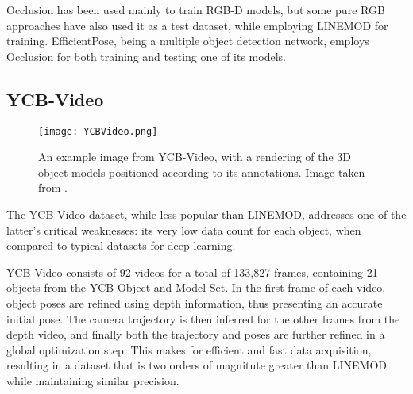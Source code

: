 Occlusion has been used mainly to train RGB-D models, but some pure RGB approaches \cite{PVNet}\cite{PoseCNN} have also used it as a test dataset, while employing LINEMOD for training. EfficientPose, being a multiple object detection network, employs Occlusion for both training and testing one of its models.

\subsection{YCB-Video}

\begin{figure}[ht]
    \centering
    \texttt{[image: YCBVideo.png]}
    \caption{An example image from YCB-Video, with a rendering of the 3D object models positioned according to its annotations. Image taken from \cite{PoseCNN}.}
\end{figure}

The YCB-Video dataset\cite{PoseCNN}, while less popular than LINEMOD, addresses one of the latter's critical weaknesses: its very low data count for each object, when compared to typical datasets for deep learning.

YCB-Video consists of 92 videos for a total of 133,827 frames, containing 21 objects from the YCB Object and Model Set\cite{YCBSet}. In the first frame of each video, object poses are refined using depth information, thus presenting an accurate initial pose. The camera trajectory is then inferred for the other frames from the depth video, and finally both the trajectory and poses are further refined in a global optimization step. This makes for efficient and fast data acquisition, resulting in a dataset that is two orders of magnitute greater than LINEMOD while maintaining similar precision.